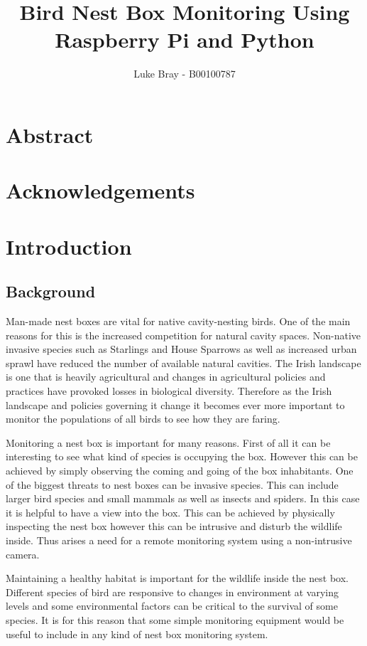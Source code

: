 \documentclass[10pt,a4paper]{article}
\author{Luke Bray - B00100787}
\title{Bird Nest Box Monitoring Using Raspberry Pi and Python}
\begin{document}
\maketitle
\pagebreak
\section{Abstract}
\pagebreak
\section{Acknowledgements}
\pagebreak
\tableofcontents
\pagebreak
\listoffigures
\pagebreak
\listoftables
\pagebreak
\section{Introduction}
\subsection{Background}
Man-made nest boxes are vital for native cavity-nesting birds. One of the main reasons for this is the increased competition for natural cavity spaces. Non-native invasive species such as Starlings and House Sparrows as well as increased urban sprawl have reduced the number of available natural cavities. The Irish landscape is one that is heavily agricultural and changes in agricultural policies and practices have provoked losses in biological diversity\citep{PIERRET201814}. Therefore as the Irish landscape and policies governing it change it becomes ever more important to monitor the populations of all birds to see how they are faring\citep{website:birdwatchireland}. 

Monitoring a nest box is important for many reasons. First of all it can be interesting to see what kind of species is occupying the box. However this can be achieved by simply observing the coming and going of the box inhabitants. One of the biggest threats to nest boxes can be invasive species. This can include larger bird species and small mammals as well as insects and spiders. In this case it is helpful to have a view into the box. This can be achieved by physically inspecting the nest box however this can be intrusive and disturb the wildlife inside. Thus arises a need for a remote monitoring system using a non-intrusive camera. 

Maintaining a healthy habitat is important for the wildlife inside the nest box. Different species of bird are responsive to changes in environment at varying levels and some environmental factors can be critical to the survival of some species\citep{wormworth06}. It is for this reason that some simple monitoring equipment would be useful to include in any kind of nest box monitoring system.
\end{document}
